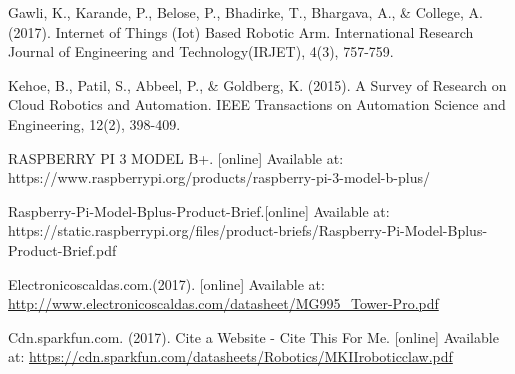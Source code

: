 \documentclass[conference]{IEEEtran}
\begin{document}
\begin{thebibliography}{1}
Gawli, K., Karande, P., Belose, P., Bhadirke, T., Bhargava, A., \& College, A. (2017). Internet of Things (Iot) Based Robotic Arm. International Research Journal of Engineering and Technology(IRJET), 4(3), 757-759.

Kehoe, B., Patil, S., Abbeel, P., \& Goldberg, K. (2015). A Survey of Research on Cloud Robotics and Automation. IEEE Transactions on Automation Science and Engineering, 12(2), 398-409.

RASPBERRY PI 3 MODEL B+. [online] Available at: https://www.raspberrypi.org/products/raspberry-pi-3-model-b-plus/

Raspberry-Pi-Model-Bplus-Product-Brief.[online] Available at: https://static.raspberrypi.org/files/product-briefs/Raspberry-Pi-Model-Bplus-Product-Brief.pdf

Electronicoscaldas.com.(2017). [online] Available at: \url{http://www.electronicoscaldas.com/datasheet/MG995_Tower-Pro.pdf}

Cdn.sparkfun.com. (2017). Cite a Website - Cite This For Me. [online] Available at: \url{https://cdn.sparkfun.com/datasheets/Robotics/MKIIroboticclaw.pdf}


\end{thebibliography}




\end{document}
